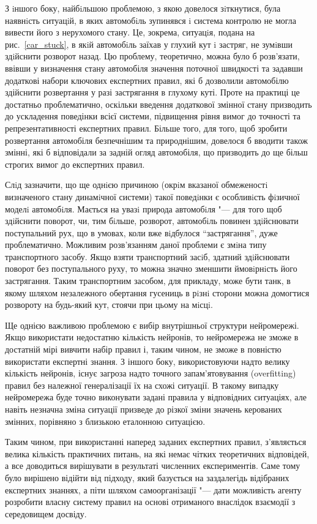 \documentclass[a4paper,10pt]{article}
\begin{document}
З iншого боку, найбiльшою проблемою, з якою довелося зiткнутися, була наявнiсть ситуацiй, в яких автомобiль зупинявся i система контролю не могла вивести його з нерухомого стану. Це, зокрема, ситуацiя, подана на рис.~\ref{car_stuck}, в якiй автомобiль заїхав у глухий кут i застряг, не зумiвши здiйснити розворот назад. Цю проблему, теоретично, можна було б розв'язати, ввівши у визначення стану автомобіля значення поточної швидкості та задавши додаткові набори ключових експертних правил, які б дозволили автомобілю здійснити розвертання у разі застрягання в глухому куті. Проте на практиці це достатньо проблематично, оскільки введення додаткової змінної стану призводить до ускладення поведінки всієї системи, підвищення рівня вимог до точності та репрезентативності експертних правил. Більше того, для того, щоб зробити розвертання автомобіля безпечнішим та природнішим, довелося б вводити також змінні, які б відповідали за задній огляд автомобіля, що призводить до ще більш строгих вимог до експертних правил.

Слiд зазначити, що ще однiєю причиною (окрiм вказаної обмеженостi визначеного стану динамiчної системи) такої поведiнки є особливiсть фiзичної моделi автомобiля. Мається на увазi природа автомобiля "--- для того щоб здiйснити поворот, чи, тим бiльше, розворот, автомобiль повинен здiйснювати поступальний рух, що в умовах, коли вже вiдбулося ``застрягання'', дуже проблематично. Можливим розв’язанням даної проблеми є змiна типу транспортного засобу. Якщо взяти транспортний засiб, здатний здiйснювати поворот без поступального руху, то можна значно зменшити ймовiрнiсть його застрягання. Таким транспортним засобом, для прикладу, може бути танк, в якому шляхом незалежного обертання гусениць
в рiзнi сторони можна домогтися розвороту на будь-який кут, стоячи при цьому на мiсцi.

Ще однією важливою проблемою є вибір внутрішньої структури нейромережі. Якщо використати недостатню кількість нейронів, то нейромережа не зможе в достатній мірі вивчити набір правил і, таким чином, не зможе в повністю використати експертні знання. З іншого боку, використовуючи надто велику кількість нейронів, існує загроза надто точного запам'ятовування (overfitting) правил без належної генералізації їх на схожі ситуації. В такому випадку нейромережа буде точно виконувати задані правила у відповідних ситуаціях, але навіть незначна зміна ситуації призведе до різкої зміни значень керованих змінних, порівняно з близькою еталонною ситуацією.

Таким чином, при використанні наперед заданих експертних правил, з'являється велика кількість практичних питань, на які немає чітких теоретичних відповідей, а все доводиться вирішувати в результаті численних експериментів. Саме тому було вирішено відійти від підходу, який базується на заздалегідь відібраних експертних знаннях, а піти шляхом самоорганізації "--- дати можливість агенту розробити власну систему правил на основі отриманого внаслідок взаємодії з середовищем досвіду.
\end{document}
